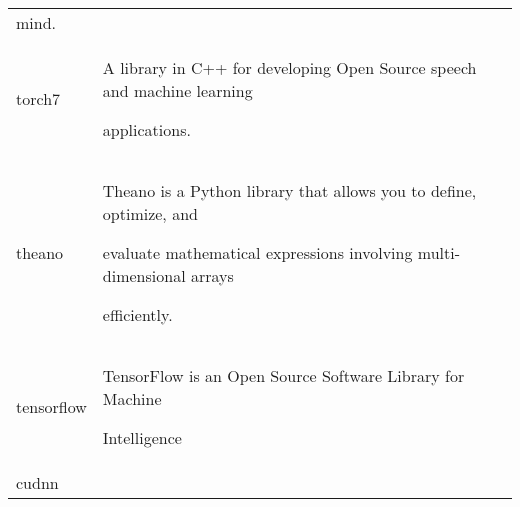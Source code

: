 \documentclass[]{article}
\begin{document}
\begin{longtable}[]{@{}ll@{}}
\begin{minipage}[t]{0.18\columnwidth}
mind.\strut

\end{minipage}\tabularnewline

\begin{minipage}[t]{0.17\columnwidth}\raggedright\strut

torch7\strut

\end{minipage} & \begin{minipage}[t]{0.18\columnwidth}\raggedright\strut

A library in C++ for developing Open Source speech and machine learning

applications.\strut

\end{minipage}\tabularnewline

\begin{minipage}[t]{0.17\columnwidth}\raggedright\strut

theano\strut

\end{minipage} & \begin{minipage}[t]{0.18\columnwidth}\raggedright\strut

Theano is a Python library that allows you to define, optimize, and

evaluate mathematical expressions involving multi-dimensional arrays

efficiently.\strut

\end{minipage}\tabularnewline

\begin{minipage}[t]{0.17\columnwidth}\raggedright\strut

tensorflow\strut

\end{minipage} & \begin{minipage}[t]{0.18\columnwidth}\raggedright\strut

TensorFlow is an Open Source Software Library for Machine

Intelligence\strut

\end{minipage}\tabularnewline

\begin{minipage}[t]{0.17\columnwidth}\raggedright\strut

cudnn\strut

\end{minipage} & \begin{minipage}[t]{0.18\columnwidth}\raggedright\strut


\end{minipage}
\end{longtable}
\end{document}
